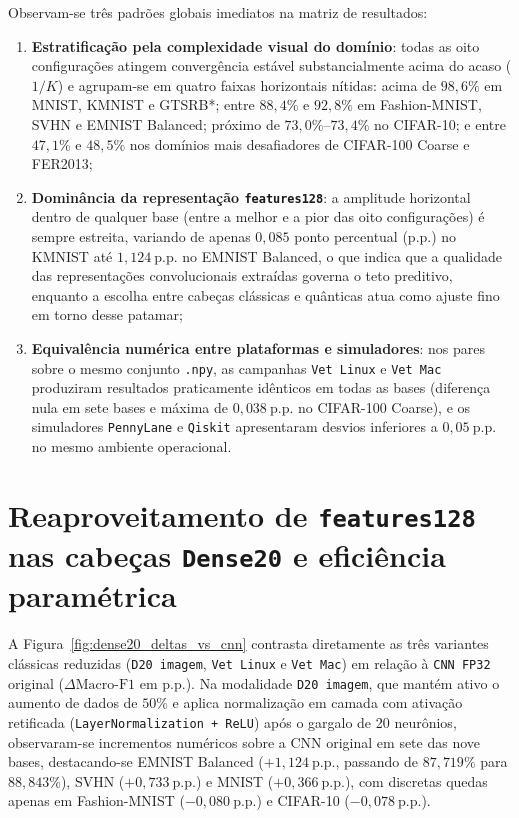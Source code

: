 \documentclass[
    12pt,
    openright,
    oneside,
    a4paper,
    english,
    brazil
]{abntex2}
\begin{document}
Observam-se três padrões globais imediatos na matriz de resultados:
\begin{enumerate}
    \item \textbf{Estratificação pela complexidade visual do domínio}: todas as oito configurações atingem convergência estável substancialmente acima do acaso (\(1/K\)) e agrupam-se em quatro faixas horizontais nítidas: acima de \(98{,}6\%\) em MNIST, KMNIST e GTSRB*; entre \(88{,}4\%\) e \(92{,}8\%\) em Fashion-MNIST, SVHN e EMNIST Balanced; próximo de \(73{,}0\%\)--\(73{,}4\%\) no CIFAR-10; e entre \(47{,}1\%\) e \(48{,}5\%\) nos domínios mais desafiadores de CIFAR-100 Coarse e FER2013;
    \item \textbf{Dominância da representação \texttt{features128}}: a amplitude horizontal dentro de qualquer base (entre a melhor e a pior das oito configurações) é sempre estreita, variando de apenas \(0{,}085\) ponto percentual (p.p.) no KMNIST até \(1{,}124~\text{p.p.}\) no EMNIST Balanced, o que indica que a qualidade das representações convolucionais extraídas governa o teto preditivo, enquanto a escolha entre cabeças clássicas e quânticas atua como ajuste fino em torno desse patamar;
    \item \textbf{Equivalência numérica entre plataformas e simuladores}: nos pares sobre o mesmo conjunto \texttt{.npy}, as campanhas \texttt{Vet Linux} e \texttt{Vet Mac} produziram resultados praticamente idênticos em todas as bases (diferença nula em sete bases e máxima de \(0{,}038~\text{p.p.}\) no CIFAR-100 Coarse), e os simuladores \texttt{PennyLane} e \texttt{Qiskit} apresentaram desvios inferiores a \(0{,}05~\text{p.p.}\) no mesmo ambiente operacional.
\end{enumerate}

\section{Reaproveitamento de \texttt{features128} nas cabeças \texttt{Dense20} e eficiência paramétrica}

A Figura~\ref{fig:dense20_deltas_vs_cnn} contrasta diretamente as três variantes clássicas reduzidas (\texttt{D20 imagem}, \texttt{Vet Linux} e \texttt{Vet Mac}) em relação à \texttt{CNN FP32} original (\(\Delta\text{Macro-F1}\) em p.p.). Na modalidade \texttt{D20 imagem}, que mantém ativo o aumento de dados de \(50\%\) e aplica normalização em camada com ativação retificada (\texttt{LayerNormalization + ReLU}) após o gargalo de 20 neurônios, observaram-se incrementos numéricos sobre a CNN original em sete das nove bases, destacando-se EMNIST Balanced (\(+1{,}124~\text{p.p.}\), passando de \(87{,}719\%\) para \(88{,}843\%\)), SVHN (\(+0{,}733~\text{p.p.}\)) e MNIST (\(+0{,}366~\text{p.p.}\)), com discretas quedas apenas em Fashion-MNIST (\(-0{,}080~\text{p.p.}\)) e CIFAR-10 (\(-0{,}078~\text{p.p.}\)).
\end{document}
